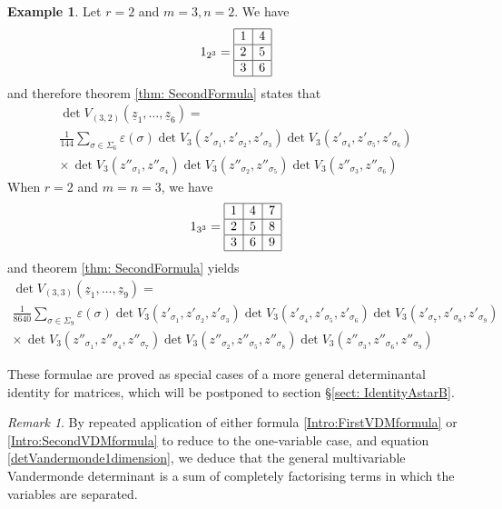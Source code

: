 \documentclass[10pt]{amsart}
\theoremstyle{definition}
\newtheorem{example}[thm]{Example}
\theoremstyle{remark}
\newtheorem{rem}[thm]{Remark}
\numberwithin{equation}{section}
\newcommand{\z}{\underline{z}}
\newcommand{\0}{\color{blue}{\mathsf{0}}}
\begin{document}
\begin{example} Let $r=2$ and $m=3, n=2$. We have
\[ 
1_{2^3} = \begin{array}{|c|c|c|} \hline
 1 &  4    \\  \hline
 2 & 5    \\ \hline
3 & 6   \\ \hline
\end{array}
\] 
 and therefore theorem \ref{thm: SecondFormula} states that
\begin{multline}  \det V_{(3,2)}(\z_1,\ldots, \z_6)  =\\  
 \frac{1}{144}  \sum_{\sigma \in \Sigma_6} \varepsilon(\sigma)   \det   V_{3}(z'_{\sigma_1},z'_{\sigma_2},z'_{\sigma_3}) \det V_{3}(z'_{\sigma_4},z'_{\sigma_5},z'_{\sigma_6}) \\
 \times \,   \det V_{3}(z''_{\sigma_1},z''_{\sigma_4})\det V_{3}(z''_{\sigma_2},z''_{\sigma_5})\det V_{3}(z''_{\sigma_3},z''_{\sigma_6})  \end{multline}
When $r=2$ and $m=n=3$, we have
\[ 
1_{3^3} = \begin{array}{|c|c|c|} \hline
 1 &  4 & 7   \\  \hline
 2 & 5  & 8  \\ \hline
3 & 6 & 9  \\ \hline
\end{array}
\] 
 and theorem \ref{thm: SecondFormula} yields
\begin{multline}  \det V_{(3,3)}(\z_1,\ldots, \z_9)  =\\  
 \frac{1}{8640}  \sum_{\sigma \in \Sigma_9} \varepsilon(\sigma)   \det  V_{3}(z'_{\sigma_1},z'_{\sigma_2},z'_{\sigma_3}) \det V_{3}(z'_{\sigma_4},z'_{\sigma_5},z'_{\sigma_6}) \det V_{3}(z'_{\sigma_7},z'_{\sigma_8},z'_{\sigma_9}) \\
 \times   \, \det V_{3}(z''_{\sigma_1},z''_{\sigma_4},z''_{\sigma_7}) \det V_{3}(z''_{\sigma_2},z''_{\sigma_5},z''_{\sigma_8})\det V_{3}(z''_{\sigma_3},z''_{\sigma_6},z''_{\sigma_9})  \end{multline}
\end{example} 



These formulae are proved as special cases of a more general determinantal identity for matrices, which will be postponed to section \S\ref{sect: IdentityAstarB}.



\begin{rem}
By repeated application of either  formula \eqref{Intro:FirstVDMformula} or \eqref{Intro:SecondVDMformula} to reduce to the one-variable case,  and equation \eqref{detVandermonde1dimension},  we deduce that the general multivariable Vandermonde determinant is a sum of completely factorising terms in which the variables are  separated. 
\end{rem}
\end{document}
